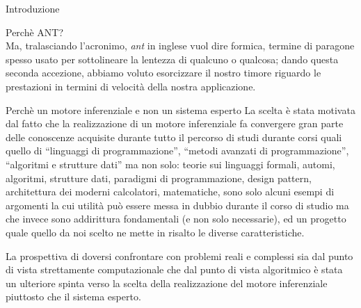 \begin{chapter}{Introduzione}
\begin{section}{Perch\`e ANT?}
\\

\noindent Ma, tralasciando l'acronimo, \textit{ant} in inglese vuol dire formica,
termine di paragone spesso usato per sottolineare la lentezza di qualcuno o qualcosa;
dando questa seconda accezione, abbiamo voluto esorcizzare il nostro timore riguardo
le prestazioni in termini di velocit\`a della nostra applicazione. 
\end{section}

\begin{section}{Perch\`e un motore inferenziale e non un sistema esperto}
La scelta \`e stata motivata dal fatto che la realizzazione di un motore inferenziale fa
convergere gran parte delle conoscenze acquisite durante tutto il percorso di studi durante
corsi quali quello di ``linguaggi di programmazione'', ``metodi avanzati di programmazione'',
``algoritmi e strutture dati'' ma non solo: teorie sui linguaggi formali, automi, algoritmi,
strutture dati, paradigmi di programmazione, design pattern, architettura dei moderni
calcolatori, matematiche, sono solo alcuni esempi di argomenti la cui utilit\`a
pu\`o essere messa in dubbio durante il corso di studio ma che invece sono addirittura
fondamentali (e non solo necessarie), ed un progetto quale quello da noi scelto ne mette
in risalto le diverse caratteristiche.

La prospettiva di doversi confrontare con problemi reali e complessi sia dal punto di vista
strettamente computazionale che dal punto di vista algoritmico \`e stata un ulteriore
spinta verso la scelta della realizzazione del motore inferenziale piuttosto che il sistema esperto.
\end{section} 

\end{chapter}
